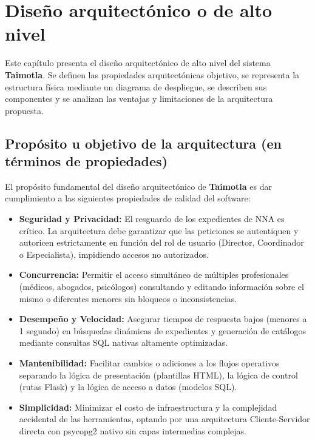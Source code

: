 \chapter{Diseño arquitectónico o de alto nivel}
\label{cap:disenoArquitectonico}

Este capítulo presenta el diseño arquitectónico de alto nivel del sistema \textbf{Taimotla}. Se definen las propiedades arquitectónicas objetivo, se representa la estructura física mediante un diagrama de despliegue, se describen sus componentes y se analizan las ventajas y limitaciones de la arquitectura propuesta.

\section{Propósito u objetivo de la arquitectura (en términos de propiedades)}
\label{sec:propositoArquitectura}

El propósito fundamental del diseño arquitectónico de \textbf{Taimotla} es dar cumplimiento a las siguientes propiedades de calidad del software:

\begin{itemize}
    \item \textbf{Seguridad y Privacidad:} El resguardo de los expedientes de NNA es crítico. La arquitectura debe garantizar que las peticiones se autentiquen y autoricen estrictamente en función del rol de usuario (Director, Coordinador o Especialista), impidiendo accesos no autorizados.
    \item \textbf{Concurrencia:} Permitir el acceso simultáneo de múltiples profesionales (médicos, abogados, psicólogos) consultando y editando información sobre el mismo o diferentes menores sin bloqueos o inconsistencias.
    \item \textbf{Desempeño y Velocidad:} Asegurar tiempos de respuesta bajos (menores a 1 segundo) en búsquedas dinámicas de expedientes y generación de catálogos mediante consultas SQL nativas altamente optimizadas.
    \item \textbf{Mantenibilidad:} Facilitar cambios o adiciones a los flujos operativos separando la lógica de presentación (plantillas HTML), la lógica de control (rutas Flask) y la lógica de acceso a datos (modelos SQL).
    \item \textbf{Simplicidad:} Minimizar el costo de infraestructura y la complejidad accidental de las herramientas, optando por una arquitectura Cliente-Servidor directa con psycopg2 nativo sin capas intermedias complejas.
\end{itemize}

